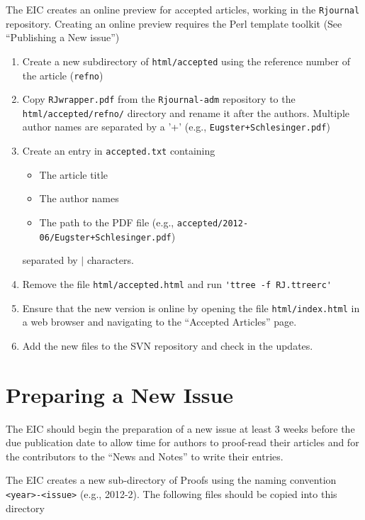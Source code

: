 \documentclass[11pt]{article}
\begin{document}
The EIC creates an online preview for accepted articles, working
in the \texttt{Rjournal} repository. Creating an online preview
requires the Perl template toolkit (See ``Publishing a New issue'')

\begin{enumerate}
\item Create a new subdirectory of \verb+html/accepted+ using the
  reference number of the article (\verb+refno+)
\item Copy \texttt{RJwrapper.pdf} from the \texttt{Rjournal-adm}
  repository to the \verb+html/accepted/refno/+ directory and rename
  it after the authors. Multiple author names are separated by a '+'
  (e.g., \texttt{Eugster+Schlesinger.pdf})
\item Create an entry in \texttt{accepted.txt} containing 
  \begin{itemize}
  \item The article title
  \item The author names
  \item The path to the PDF file (e.g.,
    \texttt{accepted/2012-06/Eugster+Schlesinger.pdf})
  \end{itemize}
  separated by $|$ characters.
\item Remove the file \verb+html/accepted.html+ and run
  \verb+'ttree -f RJ.ttreerc'+
\item Ensure that the new version is online by opening the file 
\verb+html/index.html+ in a web browser and navigating to the
``Accepted Articles'' page.
\item Add the new files to the SVN repository and check in the updates.
\end{enumerate}

\section{Preparing a New Issue}

The EIC should begin the preparation of a new issue at least 3 weeks
before the due publication date to allow time for authors to proof-read
their articles and for the contributors to the ``News and Notes'' to
write their entries.

The EIC creates a new sub-directory of Proofs using the naming
convention \verb+<year>-<issue>+ (e.g., 2012-2). The following files
should be copied into this directory
\end{document}

